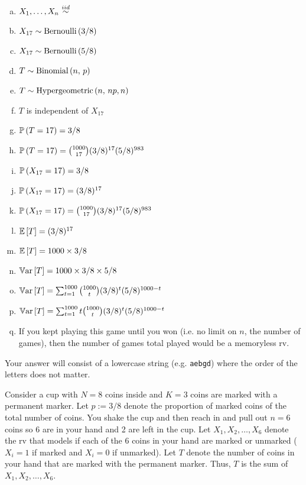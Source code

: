 \documentclass[12pt,landscape]{article}
\newcommand{\instr}{\small Your answer will consist of a lowercase string (e.g. \texttt{aebgd}) where the order of the letters does not matter. \normalsize}
\begin{document}
\vspace{-0.2cm}\benum{} 
\begin{enumerate}[(a)]
\item $\Xoneton \iid$
\item $X_{17} \sim \mathrm{Bernoulli}\left(3/8\right)$
\item $X_{17} \sim \mathrm{Bernoulli}\left(5/8\right)$
\item $T \sim \mathrm{Binomial}\left(n,\,p\right)$
\item $T \sim \mathrm{Hypergeometric}\left(n,\,np,n\right)$ 
\item $T$ is independent of $X_{17}$
\item $\mathbb{P}\left(T = 17\right) = 3/8$
\item $\mathbb{P}\left(T = 17\right) = \binom{1000}{17} (3/8)^{17} (5/8)^{983}$
\item $\mathbb{P}\left(X_{17} = 17\right) = 3/8$
\item $\mathbb{P}\left(X_{17} = 17\right) = (3/8)^{17}$
\item $\mathbb{P}\left(X_{17} = 17\right) = \binom{1000}{17} (3/8)^{17} (5/8)^{983}$
\item $\mathbb{E}\left[T\right] = (3/8)^{17}$
\item $\mathbb{E}\left[T\right] = 1000 \times 3/8$
\item $\mathbb{V}\text{ar}\left[T\right] = 1000 \times 3/8 \times 5/8$
\item $\mathbb{V}\text{ar}\left[T\right] = \sum_{t=1}^{1000} \binom{1000}{t} (3/8)^{t} (5/8)^{1000 - t}$
\item $\mathbb{V}\text{ar}\left[T\right] = \sum_{t=1}^{1000} t \binom{1000}{t} (3/8)^{t} (5/8)^{1000 - t}$
\item If you kept playing this game until you won (i.e. no limit on $n$, the number of games), then the number of games total played would be a memoryless rv.
\end{enumerate}
\eenum\instr\pagebreak


\problem{} Consider a cup with $N = 8$ coins inside and $K = 3$ coins are marked with a permanent marker. Let $p := 3/8$ denote the proportion of marked coins of the total number of coins. You shake the cup and then reach in and pull out $n = 6$ coins so 6 are in your hand and 2 are left in the cup. Let $X_1, X_2, \ldots, X_6$ denote the rv that models if each of the 6 coins in your hand are marked or unmarked ($X_i = 1$ if marked and $X_i = 0$ if unmarked). Let $T$ denote the number of coins in your hand that are marked with the permanent marker. Thus, $T$ is the sum of $X_1, X_2, \ldots, X_6$.
\end{document}
